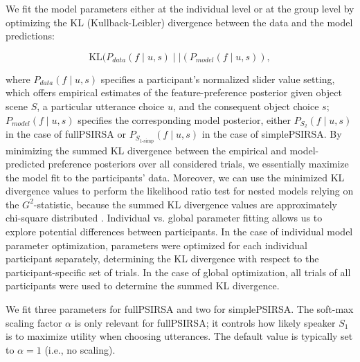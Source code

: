 \documentclass[10pt,a4paper]{article}
\begin{document}
We fit the model parameters either at the individual level or at the group level by optimizing the KL (Kullback-Leibler) divergence between the data and the model predictions:

\begin{equation}
\textrm{KL}(P_{data}(f \mid u,s)\mid\mid (P_{model}(f\mid u,s)),
\end{equation}


\noindent where $P_{data}(f\mid u,s)$ specifies a participant's normalized slider value setting, which offers empirical estimates of the feature-preference posterior given object scene $S$, a particular utterance choice $u$, and the consequent object choice $s$;
$P_{model}(f\mid u,s)$ specifies the corresponding model posterior, either $P_{S_{2}}(f\mid u,s)$ in the case of fullPSIRSA or $P_{S_{1\textrm{-simp}}}(f\mid u,s)$ in the case of simplePSIRSA. 
By minimizing the summed KL divergence between the empirical and model-predicted preference posteriors over all considered trials, we essentially maximize the model fit to the participants' data. 
Moreover, we can use the minimized KL divergence values to perform the likelihood ratio test for nested models relying on the $G^2$-statistic, because the summed KL divergence values are approximately chi-square distributed \cite{Lewandowsky:2011}. 
Individual vs. global parameter fitting allows us to explore potential differences between participants.
In the case of individual model parameter optimization, parameters were optimized for each individual participant separately, determining the KL divergence with respect to the participant-specific set of trials. 
In the case of global optimization, all trials of all participants were used to determine the summed KL divergence.

We fit three parameters for fullPSIRSA and two for simplePSIRSA.
The soft-max scaling factor $\alpha$ is only relevant for fullPSIRSA; it  controls how likely speaker $S_1$ is to maximize utility when choosing utterances. 
The default value is typically set to $\alpha=1$ (i.e., no scaling). 
\end{document}

